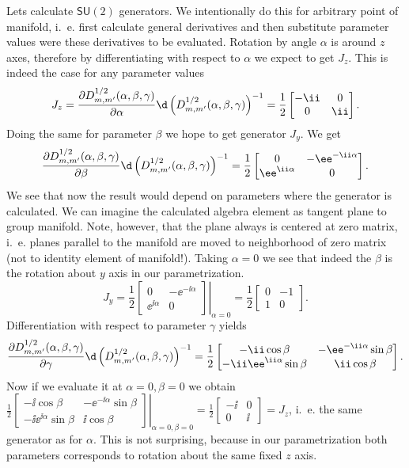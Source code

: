 \begin{example}
\begin{example}
Lets calculate $\mathsf{SU}(2)$ generators. We intentionally do
this for arbitrary point of manifold, i.~e. first calculate
general derivatives and then substitute parameter values were
these derivatives to be evaluated. Rotation by angle $\alpha$ is
around $z$ axes, therefore by differentiating with respect to
$\alpha$ we expect to get $J_z$.  This is indeed the case for any
parameter values
\[
J_z=\frac{\partial
D^{1/2}_{m,m^\prime}(\alpha,\beta,\gamma)}{\partial \alpha}\d
\left(D^{1/2}_{m,m^\prime}(\alpha,\beta,\gamma)\right)^{-1}=
\frac12\begin{bmatrix}-\ii&0\\0&\ii\end{bmatrix}.
\]
Doing the same for parameter $\beta$ we hope to get generator
$J_y$. We get
\[
\frac{\partial D^{1/2}_{m,m^\prime}(\alpha,\beta,\gamma)}{\partial
\beta} \d
\left(D^{1/2}_{m,m^\prime}(\alpha,\beta,\gamma)\right)^{-1}=
\frac12
\begin{bmatrix}0&-\ee^{-\ii \alpha}\\\ee^{\ii \alpha}&0\end{bmatrix}.
\]
We see that now the result would depend on parameters  where the
generator is calculated. We can imagine the calculated algebra
element as tangent plane to group manifold. Note, however, that
the plane always is centered at zero matrix, i.~e. planes parallel
to the manifold are moved to neighborhood of zero matrix (not to
identity element of manifold!). Taking  $\alpha=0$ we see that
indeed the $\beta$ is the rotation about $y$ axis in our
parametrization.
\[
J_y=\frac12\left.\begin{bmatrix}0&-\ee^{-\ii \alpha}\\\ee^{\ii
\alpha}&0\end{bmatrix}\right|_{\alpha=0}=\frac12\begin{bmatrix}0&-1\\
1&0\end{bmatrix}.
\]
Differentiation with respect to parameter $\gamma$ yields
\[
\frac{\partial D^{1/2}_{m,m^\prime}(\alpha,\beta,\gamma)}{\partial
\gamma}\d
\left(D^{1/2}_{m,m^\prime}(\alpha,\beta,\gamma)\right)^{-1}=
 \frac12\begin{bmatrix}-\ii\cos\beta&-\ee^{-\ii \alpha}\sin\beta\\-\ii \ee^{\ii \alpha}\sin\beta&\ii\cos\beta\end{bmatrix}.
\]
Now if we evaluate it at $\alpha=0, \beta=0$ we obtain $
\frac12\left.\begin{bmatrix}-\ii\cos\beta&-\ee^{-\ii
\alpha}\sin\beta\\-\ii \ee^{\ii
\alpha}\sin\beta&\ii\cos\beta\end{bmatrix}\right|_{\alpha=0,\beta=0}=\frac12\begin{bmatrix}-\ii&0\\0&\ii\end{bmatrix}=J_z$,
i.~e. the same generator as for $\alpha$. This is not surprising,
because in our  parametrization both parameters corresponds to
rotation about the same fixed $z$ axis.


\end{example}
\end{example}
